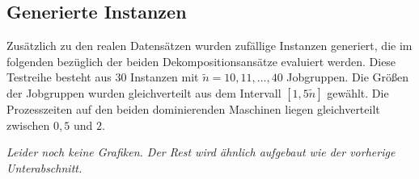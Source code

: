 \documentclass{scrreprt}
\begin{document}
\subsection{Generierte Instanzen}
\label{subsec:GenerierteInstanzen}
Zusätzlich zu den realen Datensätzen wurden zufällige Instanzen generiert, die im folgenden bezüglich der beiden Dekompositionsansätze evaluiert werden.
Diese Testreihe besteht aus 30 Instanzen mit $\tilde{n}=10,11,\ldots,40$ Jobgruppen.
Die Größen der Jobgruppen wurden gleichverteilt aus dem Intervall $[1,5\tilde{n}]$ gewählt.
Die Prozesszeiten auf den beiden dominierenden Maschinen liegen gleichverteilt zwischen $0{,}5$ und $2$.

\textit{Leider noch keine Grafiken. Der Rest wird ähnlich aufgebaut wie der vorherige Unterabschnitt.}



\newpage


\end{document}
